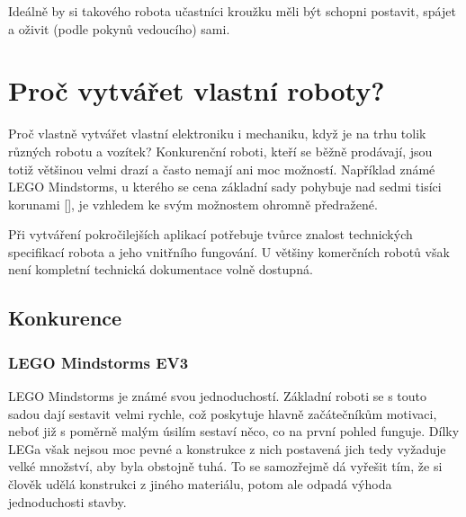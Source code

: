 \documentclass{template/socthesis}
\begin{document}
Ideálně by si takového robota učastníci kroužku měli být schopni postavit, spájet a oživit (podle pokynů vedoucího) sami. 





\newpage

\chapter{Proč vytvářet vlastní roboty?}

Proč vlastně vytvářet vlastní elektroniku i mechaniku, když je na trhu tolik různých robotu a vozítek? Konkurenční roboti, kteří se běžně prodávají, jsou totiž většinou velmi drazí a často nemají ani moc možností. Například známé LEGO Mindstorms, u kterého se cena základní sady pohybuje nad sedmi tisíci korunami [], %
 je vzhledem ke svým možnostem ohromně předražené.
 
Při vytváření pokročilejších aplikací potřebuje tvůrce znalost technických specifikací robota a jeho vnitřního fungování. U většiny komerčních robotů však není kompletní technická dokumentace volně dostupná.


\section{Konkurence} \label{konkurence}

\subsection{LEGO Mindstorms EV3}

LEGO Mindstorms je známé svou jednoduchostí. Základní roboti se s touto sadou dají sestavit velmi rychle, což poskytuje hlavně začátečníkům motivaci, neboť již s poměrně malým úsilím sestaví něco, co na první pohled funguje. Dílky LEGa však nejsou moc pevné a konstrukce z nich postavená jich tedy vyžaduje velké množství, aby byla obstojně tuhá. To se samozřejmě dá vyřešit tím, že si člověk udělá konstrukci z jiného materiálu, potom ale odpadá výhoda jednoduchosti stavby.
\end{document}
